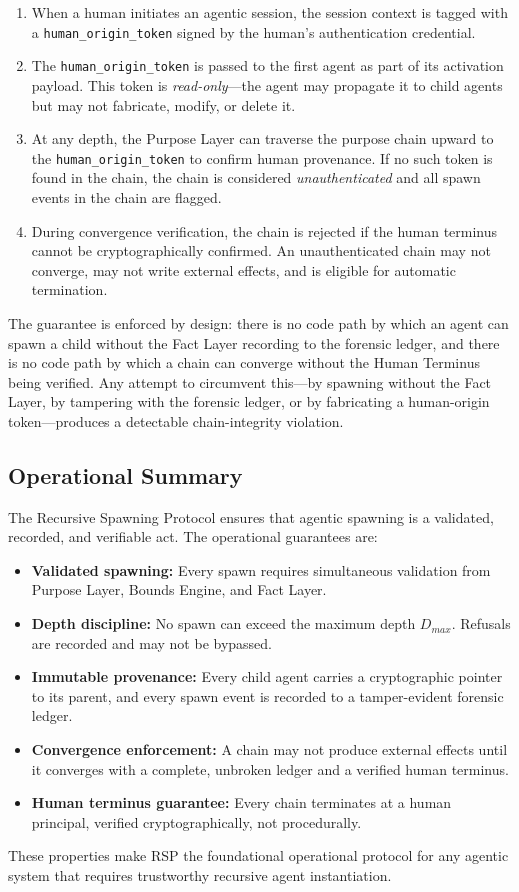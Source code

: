 \begin{enumerate}
\item When a human initiates an agentic session, the session context is tagged with a \texttt{human\_origin\_token} signed by the human's authentication credential.
\item The \texttt{human\_origin\_token} is passed to the first agent as part of its activation payload. This token is \textit{read-only}—the agent may propagate it to child agents but may not fabricate, modify, or delete it.
\item At any depth, the Purpose Layer can traverse the purpose chain upward to the \texttt{human\_origin\_token} to confirm human provenance. If no such token is found in the chain, the chain is considered \textit{unauthenticated} and all spawn events in the chain are flagged.
\item During convergence verification, the chain is rejected if the human terminus cannot be cryptographically confirmed. An unauthenticated chain may not converge, may not write external effects, and is eligible for automatic termination.
\end{enumerate}

The guarantee is enforced by design: there is no code path by which an agent can spawn a child without the Fact Layer recording to the forensic ledger, and there is no code path by which a chain can converge without the Human Terminus being verified. Any attempt to circumvent this—by spawning without the Fact Layer, by tampering with the forensic ledger, or by fabricating a human-origin token—produces a detectable chain-integrity violation.

\subsection{Operational Summary}

The Recursive Spawning Protocol ensures that agentic spawning is a validated, recorded, and verifiable act. The operational guarantees are:

\begin{itemize}
\item \textbf{Validated spawning:} Every spawn requires simultaneous validation from Purpose Layer, Bounds Engine, and Fact Layer.
\item \textbf{Depth discipline:} No spawn can exceed the maximum depth $D_{max}$. Refusals are recorded and may not be bypassed.
\item \textbf{Immutable provenance:} Every child agent carries a cryptographic pointer to its parent, and every spawn event is recorded to a tamper-evident forensic ledger.
\item \textbf{Convergence enforcement:} A chain may not produce external effects until it converges with a complete, unbroken ledger and a verified human terminus.
\item \textbf{Human terminus guarantee:} Every chain terminates at a human principal, verified cryptographically, not procedurally.
\end{itemize}

These properties make RSP the foundational operational protocol for any agentic system that requires trustworthy recursive agent instantiation.